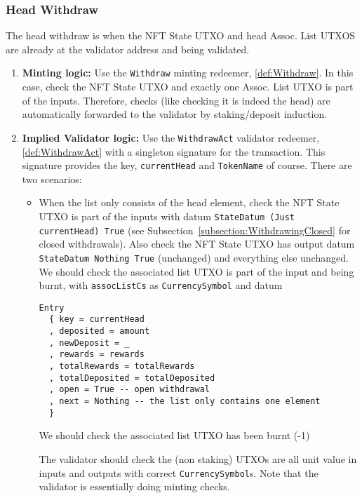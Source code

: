 \documentclass[10pt, a4paper]{article}
\theoremstyle{definition}
\begin{document}
\subsubsection{Head Withdraw}\label{subsubsection:HeadWithdraw}
The head withdraw is when the NFT State UTXO and head Assoc. List UTXOS are already at the validator address and being validated.
\begin{enumerate}
\item{\textbf{Minting logic:} Use the \texttt{Withdraw} minting redeemer, \ref{def:Withdraw}. In this case, check the NFT State UTXO and exactly one Assoc. List UTXO is part of the inputs. Therefore, checks (like checking it is indeed the head) are automatically forwarded to the validator by staking/deposit induction.}
\item{\textbf{Implied Validator logic:} Use the \texttt{WithdrawAct} validator redeemer, \ref{def:WithdrawAct} with a singleton signature for the transaction. This signature provides the key, \texttt{currentHead} and \texttt{TokenName} of course. There are two scenarios:

\begin{itemize}
\item{When the list only consists of the head element, check the NFT State UTXO is part of the inputs with datum \texttt{StateDatum (Just currentHead) True} (see Subsection~\ref{subsection:WithdrawingClosed} for closed withdrawals). Also check the NFT State UTXO has output datum \texttt{StateDatum Nothing True} (unchanged) and everything else unchanged. We should check the associated list UTXO is part of the input and being burnt, with \texttt{assocListCs} as \texttt{CurrencySymbol} and datum
\begin{verbatim}
Entry
  { key = currentHead
  , deposited = amount
  , newDeposit = _
  , rewards = rewards
  , totalRewards = totalRewards 
  , totalDeposited = totalDeposited
  , open = True -- open withdrawal
  , next = Nothing -- the list only contains one element
  }
\end{verbatim}

 We should check the associated list UTXO has been burnt (-1)

The validator should check the (non staking) UTXOs are all unit value in inputs and outputs with correct \texttt{CurrencySymbol}s. Note that the validator is essentially doing minting checks.

}
\end{itemize}}
\end{enumerate}
\end{document}
